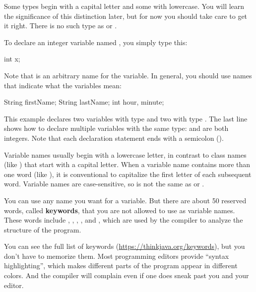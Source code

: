 Some types begin with a capital letter and some with lowercase.
You will learn the significance of this distinction later, but for now you should take care to get it right.
There is no such type as  or .

To declare an integer variable named , you simply type this:

\begin{code}
int x;
\end{code}

Note that  is an arbitrary name for the variable.
In general, you should use names that indicate what the variables mean:

\begin{code}
String firstName;
String lastName;
int hour, minute;
\end{code}

This example declares two variables with type  and two with type .
The last line shows how to declare multiple variables with the same type:  and  are both integers.
Note that each declaration statement ends with a semicolon (\java{;}).


Variable names usually begin with a lowercase letter, in contrast to class names (like ) that start with a capital letter.
When a variable name contains more than one word (like ), it is conventional to capitalize the first letter of each subsequent word.
Variable names are case-sensitive, so  is not the same as  or .


You can use any name you want for a variable.
But there are about 50 reserved words, called {\bf keywords}, that you are not allowed to use as variable names.
These words include , , , , and , which are used by the compiler to analyze the structure of the program.

You can see the full list of keywords (\url{https://thinkjava.org/keywords}), but you don't have to memorize them.
Most programming editors provide ``syntax highlighting'', which makes different parts of the program appear in different colors.
And the compiler will complain even if one does sneak past you and your editor.

